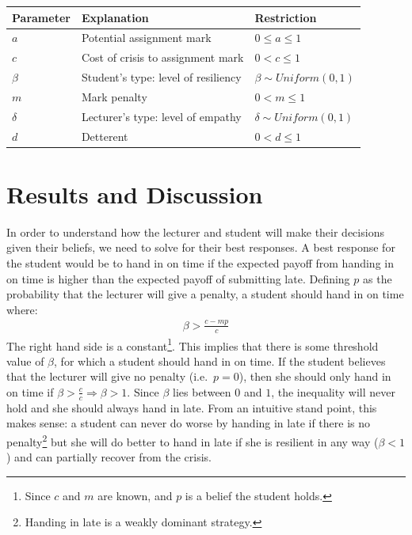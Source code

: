 \documentclass[11pt,preprint, authoryear]{elsarticle}
\let\origtable\table
\let\endorigtable\endtable
\renewenvironment{table}[1][2] {
    \expandafter\origtable\expandafter[H]
} {
    \endorigtable
}
\numberwithin{equation}{section}
\numberwithin{figure}{section}
\numberwithin{table}{section}
\let\rmarkdownfootnote\footnote%
\def\footnote{\protect\rmarkdownfootnote}
\begin{document}
\begin{table}[H]
\centering
\begin{tabular}{lll}
  \toprule
Parameter & Explanation & Restriction \\ 
  \midrule
$a$ & Potential assignment mark & $0\leq a \leq 1$ \\ 
  $c$ & Cost of crisis to assignment mark & $0 < c \leq 1$ \\ 
  $\beta$ & Student's type: level of resiliency & $\beta \sim Uniform(0,1)$  \\ 
  $m$ & Mark penalty & $0 < m \leq 1$ \\ 
  $\delta$ & Lecturer's type: level of empathy & $\delta \sim Uniform(0,1)$ \\ 
  $d$ & Detterent & $0<d \leq 1$ \\ 
   \bottomrule
\end{tabular}
\caption{Game Parameters \label{sum}} 
\end{table}

\hypertarget{results-and-discussion}{%
\section{\texorpdfstring{Results and Discussion
\label{result}}{Results and Discussion }}\label{results-and-discussion}}

In order to understand how the lecturer and student will make their
decisions given their beliefs, we need to solve for their best
responses. A best response for the student would be to hand in on time
if the expected payoff from handing in on time is higher than the
expected payoff of submitting late. Defining \(p\) as the probability
that the lecturer will give a penalty, a student should hand in on time
where: \begin{align*}
\beta>\frac{c-m p}{c}
\end{align*} The right hand side is a constant\footnote{Since \(c\) and
  \(m\) are known, and \(p\) is a belief the student holds.}. This
implies that there is some threshold value of \(\beta\), for which a
student should hand in on time. If the student believes that the
lecturer will give no penalty (i.e.~\(p=0\)), then she should only hand
in on time if \(\beta > \frac{c}{c} \Rightarrow \beta > 1\). Since
\(\beta\) lies between \(0\) and \(1\), the inequality will never hold
and she should always hand in late. From an intuitive stand point, this
makes sense: a student can never do worse by handing in late if there is
no penalty\footnote{Handing in late is a weakly dominant strategy.} but
she will do better to hand in late if she is resilient in any way
(\(\beta < 1\)) and can partially recover from the crisis.
\end{document}
